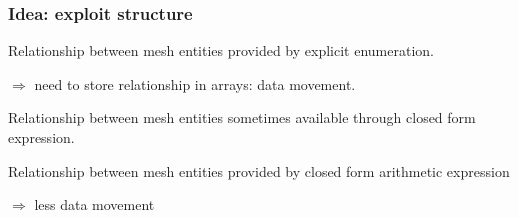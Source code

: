 \documentclass[presentation,aspectratio=43, 10pt]{beamer}
\begin{document}
\begin{frame}
  \frametitle{Idea: exploit structure}
  \begin{definition}
    Relationship between mesh entities provided by explicit
    enumeration.

    $\Rightarrow$ need to store relationship in arrays: data movement.
  \end{definition}
  \begin{definition}
    Relationship between mesh entities sometimes available through
    closed form expression.
  \end{definition}
  \begin{definition}
    Relationship between mesh entities provided by closed form
    arithmetic expression

    $\Rightarrow$ less data movement
  \end{definition}
\end{frame}
\end{document}
